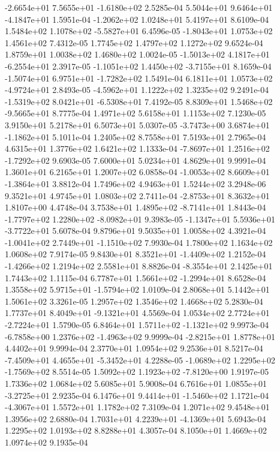 -2.6654e+01  7.5655e+01 -1.6180e+02  2.5285e-04
 5.5044e+01  9.6464e+01 -4.1847e+01  1.5951e-04
-1.2062e+02  1.0248e+01  5.4197e+01  8.6109e-04
 1.5484e+02  1.1078e+02 -5.5827e+01  6.4596e-05
-1.8043e+01  1.0753e+02  1.4561e+02  7.4312e-05
1.7745e+02 1.4797e+02 1.1272e+02  9.6524e-04
1.8759e+01 1.0038e+02 1.4680e+02  1.0024e-05
-1.5013e+02  4.1817e+01 -6.2554e+01  2.3917e-05
-1.1051e+02  1.4450e+02 -3.7155e+01  8.1659e-04
-1.5074e+01  6.9751e+01 -1.7282e+02  1.5491e-04
 6.1811e+01  1.0573e+02 -4.9724e+01  2.8493e-05
-4.5962e+01  1.1222e+02  1.3235e+02  9.2491e-04
-1.5319e+02  8.0421e+01 -6.5308e+01  7.4192e-05
 8.8309e+01  1.5468e+02 -9.5665e+01  8.7775e-04
1.4971e+02 5.6158e+01 1.1153e+02  7.1230e-05
3.9150e+01 5.2178e+01 6.5073e+01  5.0307e-05
-3.7473e+00  3.6874e+01 -1.1862e+01  5.1011e-04
1.2405e+02 8.7558e+01 7.5193e+01  2.7965e-04
4.6315e+01 1.3776e+02 1.6421e+02  1.1333e-04
-7.8697e+01  1.2516e+02 -1.7292e+02  9.6903e-05
7.6000e+01 5.0234e+01 4.8629e+01  9.9991e-04
1.3601e+01 6.2165e+01 1.2007e+02  6.0858e-04
-1.0053e+02  8.6609e+01 -1.3864e+01  3.8812e-04
1.7496e+02 4.9463e+01 1.5244e+02  3.2948e-06
9.3521e+01 4.9745e+01 1.0803e+02  2.7411e-04
-2.8753e+01  8.3632e+01  1.8107e+00  4.4748e-04
 3.7538e+01  1.4895e+02 -8.7141e+01  1.8443e-04
-1.7797e+02  1.2280e+02 -8.0982e+01  9.3983e-05
-1.1347e+01  5.5936e+01 -3.7722e+01  5.6078e-04
9.8796e+01 9.5035e+01 1.0058e+02  4.3921e-04
-1.0041e+02  2.7449e+01 -1.1510e+02  7.9930e-04
1.7800e+02 1.1634e+02 1.0608e+02  7.9174e-05
 9.8430e+01  8.3521e+01 -1.4409e+02  1.2152e-04
-1.4266e+02  1.2194e+02  2.5581e+01  8.8826e-04
-8.3554e+01  2.1425e+01  1.7443e+02  1.1115e-04
 6.7787e+01  1.5661e+02 -1.2994e+01  8.6528e-04
 1.3558e+02  5.9715e+01 -1.5794e+02  1.0109e-04
2.8068e+01 5.1442e+01 1.5061e+02  3.3261e-05
1.2957e+02 1.3546e+02 1.4668e+02  5.2830e-04
 1.7737e+01  8.4049e+01 -9.1321e+01  4.5569e-04
 1.0534e+02  2.7724e+01 -2.7224e+01  1.5790e-05
 6.8464e+01  1.5711e+02 -1.1321e+02  9.9973e-04
-6.7858e+00  1.2376e+02 -1.4963e+02  9.9999e-04
-2.8215e+01  1.8778e+01  4.4402e+01  9.9994e-04
2.3770e+01 1.0954e+02 9.2536e+01  8.5217e-04
-7.4509e+01  4.4655e+01 -5.3452e+01  4.2288e-05
-1.0689e+02  1.2295e+02 -1.7569e+02  8.5514e-05
 1.5092e+02  1.1923e+02 -7.8120e+00  1.9197e-05
1.7336e+02 1.0684e+02 5.6085e+01  5.9008e-04
 6.7616e+01  1.0855e+01 -3.2725e+01  2.9235e-04
 6.1476e+01  9.4414e+01 -1.5460e+02  1.1721e-04
-4.3067e+01  1.5572e+01  1.1782e+02  7.3109e-04
1.2071e+02 9.4548e+01 1.3956e+02  2.6880e-04
 1.7031e+01  4.2239e+01 -4.1369e+01  5.6943e-04
1.2295e+02 1.0193e+02 8.8288e+01  4.3057e-04
8.1050e+01 1.4669e+02 1.0974e+02  9.1935e-04
